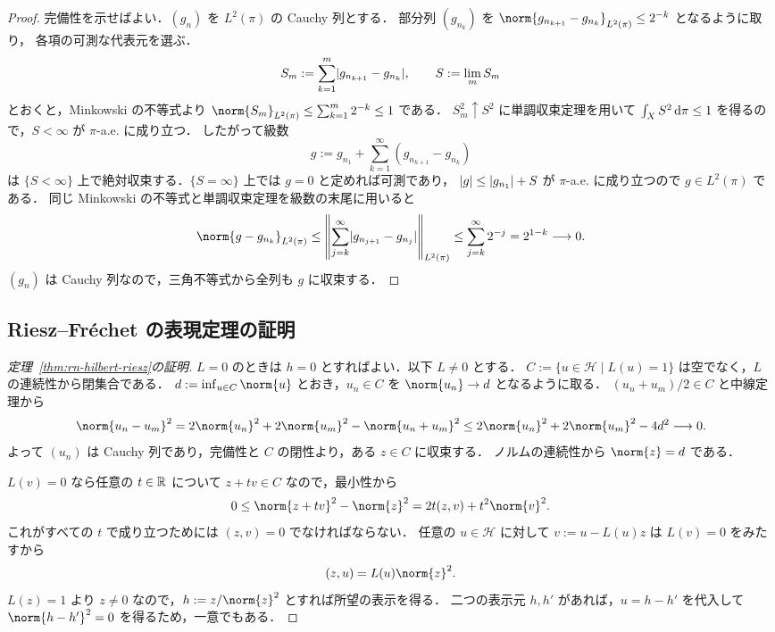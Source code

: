 \begin{proof}
  完備性を示せばよい．$(g_n)$ を $L^2(\pi)$ の Cauchy 列とする．
  部分列 $(g_{n_k})$ を $\norm{g_{n_{k+1}}-g_{n_k}}_{L^2(\pi)}\leq2^{-k}$ となるように取り，
  各項の可測な代表元を選ぶ．
  \[
    S_m:=\sum_{k=1}^m\lvert g_{n_{k+1}}-g_{n_k} \rvert,\qquad S:=\lim_m S_m
  \]
  とおくと，Minkowski の不等式より $\norm{S_m}_{L^2(\pi)}\leq\sum_{k=1}^m2^{-k}\leq1$ である．
  $S_m^2\uparrow S^2$ に単調収束定理を用いて $\int_XS^2\,\mathrm{d}\pi\leq1$ を得るので，$S<\infty$ が $\pi$-a.e. に成り立つ．
  したがって級数
  \[
    g:=g_{n_1}+\sum_{k=1}^{\infty}(g_{n_{k+1}}-g_{n_k})
  \]
  は $\{S<\infty\}$ 上で絶対収束する．$\{S=\infty\}$ 上では $g=0$ と定めれば可測であり，
  $\lvert g \rvert\leq\lvert g_{n_1} \rvert+S$ が $\pi$-a.e. に成り立つので $g\in L^2(\pi)$ である．
  同じ Minkowski の不等式と単調収束定理を級数の末尾に用いると
  \[
    \norm{g-g_{n_k}}_{L^2(\pi)}
    \leq\left\|\sum_{j=k}^{\infty}\abs{g_{n_{j+1}}-g_{n_j}}\right\|_{L^2(\pi)}
    \leq\sum_{j=k}^{\infty}2^{-j}=2^{1-k}\longrightarrow0.
  \]
  $(g_n)$ は Cauchy 列なので，三角不等式から全列も $g$ に収束する．
\end{proof}

\subsection{Riesz--Fréchet の表現定理の証明}

\begin{proof}[定理~\ref{thm:rn-hilbert-riesz}の証明]
  $L=0$ のときは $h=0$ とすればよい．以下 $L\neq0$ とする．
  $C:=\{u\in\mathcal{H}\mid L(u)=1\}$ は空でなく，$L$ の連続性から閉集合である．
  $d:=\inf_{u\in C}\norm{u}$ とおき，$u_n\in C$ を $\norm{u_n}\to d$ となるように取る．
  $(u_n+u_m)/2\in C$ と中線定理から
  \[
    \norm{u_n-u_m}^2
    =2\norm{u_n}^2+2\norm{u_m}^2-\norm{u_n+u_m}^2
    \leq2\norm{u_n}^2+2\norm{u_m}^2-4d^2\longrightarrow0.
  \]
  よって $(u_n)$ は Cauchy 列であり，完備性と $C$ の閉性より，ある $z\in C$ に収束する．
  ノルムの連続性から $\norm{z}=d$ である．

  $L(v)=0$ なら任意の $t\in\mathbb{R}$ について $z+tv\in C$ なので，最小性から
  \[
    0\leq\norm{z+tv}^2-\norm{z}^2
    =2t(z,v)+t^2\norm{v}^2.
  \]
  これがすべての $t$ で成り立つためには $(z,v)=0$ でなければならない．
  任意の $u\in\mathcal{H}$ に対して $v:=u-L(u)z$ は $L(v)=0$ をみたすから
  \[
    (z,u)=L(u)\norm{z}^2.
  \]
  $L(z)=1$ より $z\neq0$ なので，$h:=z/\norm{z}^2$ とすれば所望の表示を得る．
  二つの表示元 $h,h'$ があれば，$u=h-h'$ を代入して $\norm{h-h'}^2=0$ を得るため，一意でもある．
\end{proof}

